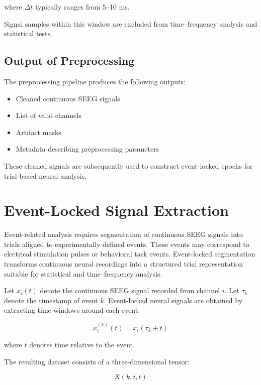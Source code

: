 \documentclass[11pt]{report}
\begin{document}
where $\Delta t$ typically ranges from 5--10 ms.

Signal samples within this window are excluded from time–frequency
analysis and statistical tests.

\section{Output of Preprocessing}

The preprocessing pipeline produces the following outputs:

\begin{itemize}
\item Cleaned continuous SEEG signals
\item List of valid channels
\item Artifact masks
\item Metadata describing preprocessing parameters
\end{itemize}

These cleaned signals are subsequently used to construct event-locked
epochs for trial-based neural analysis.





\chapter{Event-Locked Signal Extraction}

Event-related analysis requires segmentation of continuous SEEG signals
into trials aligned to experimentally defined events. These events may
correspond to electrical stimulation pulses or behavioral task events.
Event-locked segmentation transforms continuous neural recordings into
a structured trial representation suitable for statistical and
time--frequency analysis.

Let $x_i(t)$ denote the continuous SEEG signal recorded from channel $i$.
Let $\tau_k$ denote the timestamp of event $k$.
Event-locked neural signals are obtained by extracting time windows
around each event.

\begin{equation}
x_i^{(k)}(t) = x_i(\tau_k + t)
\end{equation}

where $t$ denotes time relative to the event.

The resulting dataset consists of a three-dimensional tensor:

\begin{equation}
X(k,i,t)
\end{equation}
\end{document}
